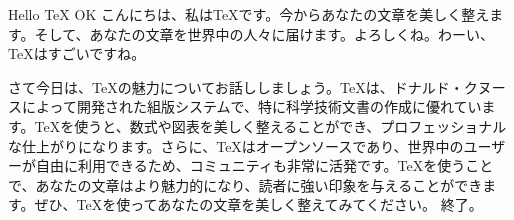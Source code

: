 \documentclass[uplatex, dvipdfmx]{bxjsarticle}
\begin{document}
Hello TeX
OK
こんにちは、私はTeXです。今からあなたの文章を美しく整えます。そして、あなたの文章を世界中の人々に届けます。よろしくね。わーい、TeXはすごいですね。 

さて今日は、TeXの魅力についてお話ししましょう。TeXは、ドナルド・クヌースによって開発された組版システムで、特に科学技術文書の作成に優れています。TeXを使うと、数式や図表を美しく整えることができ、プロフェッショナルな仕上がりになります。さらに、TeXはオープンソースであり、世界中のユーザーが自由に利用できるため、コミュニティも非常に活発です。TeXを使うことで、あなたの文章はより魅力的になり、読者に強い印象を与えることができます。ぜひ、TeXを使ってあなたの文章を美しく整えてみてください。
終了。
\end{document}
